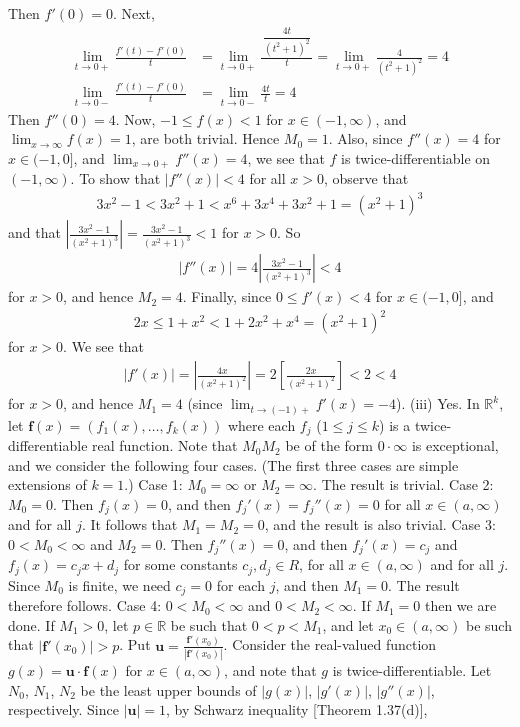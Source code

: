 \documentclass[12pt]{article}
\theoremstyle{definition}
\begin{document}
Then $f'(0)=0$. Next,
\begin{align*}
\lim_{t\to 0+}\frac{f'(t)-f'(0)}{t}
&=\lim_{t\to 0+}\frac{\,\dfrac{4t}{(t^2+1)^2}\,}{t}
=\lim_{t\to 0+}\frac{4}{(t^2+1)^2}
=4 \\
\lim_{t\to 0-}\frac{f'(t)-f'(0)}{t}
&=\lim_{t\to 0-}\frac{4t}{t}
=4
\end{align*}
Then $f''(0)=4$. Now, $-1\le f(x)<1$ for $x\in(-1,\infty)$, and $\lim_{x\to\infty}f(x)=1$, are both trivial. Hence $M_0=1$. Also, since $f''(x)=4$ for $x\in(-1,0]$, and $\lim_{x\to 0+}f''(x)=4$, we see that $f$ is twice-differentiable on $(-1,\infty)$. To show that $\left\vert f''(x)\right\vert<4$ for all $x>0$, observe that
\begin{align*}
3x^2-1<3x^2+1<x^6+3x^4+3x^2+1=(x^2+1)^3
\end{align*}
and that $\left\vert\frac{3x^2-1}{(x^2+1)^3}\right\vert=\frac{3x^2-1}{(x^2+1)^3}<1$ for $x>0$. So
\begin{align*}
\left\vert f''(x)\right\vert=4\left\vert\frac{3x^2-1}{(x^2+1)^3}\right\vert<4
\end{align*}
for $x>0$, and hence $M_2=4$. Finally, since $0\le f'(x)<4$ for $x\in(-1,0]$, and
\begin{align*}
2x\le 1+x^2<1+2x^2+x^4=(x^2+1)^2
\end{align*}
for $x>0$. We see that 
\begin{align*}
\left\vert f'(x)\right\vert=\left\vert\frac{4x}{(x^2+1)^2}\right\vert=2\left[\frac{2x}{(x^2+1)^2}\right]<2<4
\end{align*}
for $x>0$, and hence $M_1=4$ (since $\lim_{t\to(-1)+}f'(x)=-4$).
(iii) Yes. In $\mathbb{R}^k$, let $\mathbf{f}(x)=(f_1(x),\ldots,f_k(x))$ where each $f_j$ ($1\le j\le k$) is a twice-differentiable real function. Note that $M_0M_2$ be of the form $0\cdot\infty$ is exceptional, and we consider the following four cases. (The first three cases are simple extensions of $k=1$.)
Case 1: $M_0=\infty$ or $M_2=\infty$. The result is trivial.
Case 2: $M_0=0$. Then $f_j(x)=0$, and then $f_j'(x)=f_j''(x)=0$ for all $x\in(a,\infty)$ and for all $j$. It follows that $M_1=M_2=0$, and the result is also trivial.
Case 3: $0<M_0<\infty$ and $M_2=0$. Then $f_j''(x)=0$, and then $f_j'(x)=c_j$ and $f_j(x)=c_jx+d_j$ for some constants $c_j,d_j\in R$, for all $x\in(a,\infty)$ and for all $j$. Since $M_0$ is finite, we need $c_j=0$ for each $j$, and then $M_1=0$. The result therefore follows.
Case 4: $0<M_0<\infty$ and $0<M_2<\infty$. If $M_1=0$ then we are done. If $M_1>0$, let $p\in \mathbb{R}$ be such that $0<p<M_1$, and let $x_0\in(a,\infty)$ be such that $\left\vert\mathbf{f}'(x_0)\right\vert>p$. Put $\mathbf{u}=\frac{\mathbf{f}'(x_0)}{\left\vert\mathbf{f}'(x_0)\right\vert}$. Consider the real-valued function $g(x)=\mathbf{u}\cdot\mathbf{f}(x)$ for $x\in(a,\infty)$, and note that $g$ is twice-differentiable. Let $N_0$, $N_1$, $N_2$ be the least upper bounds of $\left\vert g(x)\right\vert$, $\left\vert g'(x)\right\vert$, $\left\vert g''(x)\right\vert$, respectively. Since $\left\vert\mathbf{u}\right\vert=1$, by Schwarz inequality [Theorem 1.37(d)],
\end{document}
